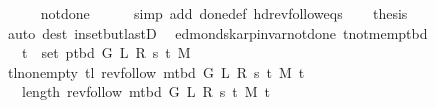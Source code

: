 \begin{isabellebody}
\ \ \ \ \isamarkupfalse%
\ not{\isacharunderscore}{\kern0pt}done{\isacharunderscore}{\kern0pt}{}\isanewline
\ \ \ \ \isamarkupfalse%
\ {\isacharparenleft}{\kern0pt}simp\ add{\isacharcolon}{\kern0pt}\ done{\isacharunderscore}{\kern0pt}{}{\isacharunderscore}{\kern0pt}def\ hd{\isacharunderscore}{\kern0pt}rev{\isacharunderscore}{\kern0pt}follow{\isacharunderscore}{\kern0pt}eq{\isacharunderscore}{\kern0pt}s{\isacharparenright}{\kern0pt}\isanewline
\ \ \isamarkupfalse%
\ {\isacharquery}{\kern0pt}thesis\isanewline
\ \ \ \ \isamarkupfalse%
\ {\isacharparenleft}{\kern0pt}auto\ dest{\isacharcolon}{\kern0pt}\ in{\isacharunderscore}{\kern0pt}set{\isacharunderscore}{\kern0pt}butlastD{\isacharparenright}{\kern0pt}\isanewline
{}\isamarkupfalse%
%
\endisatagproof
{\isafoldproof}%
%
\isadelimproof
\isanewline
%
\endisadelimproof
%
\isadeliminvisible
\isanewline
%
\endisadeliminvisible
%
\isataginvisible
{}\isamarkupfalse%
\ {\isacharparenleft}{\kern0pt}\ edmonds{\isacharunderscore}{\kern0pt}karp{\isacharunderscore}{\kern0pt}invar{\isacharunderscore}{\kern0pt}not{\isacharunderscore}{\kern0pt}done{\isacharunderscore}{\kern0pt}{}{\isacharparenright}{\kern0pt}\ t{\isacharunderscore}{\kern0pt}not{\isacharunderscore}{\kern0pt}mem{\isacharunderscore}{\kern0pt}p{\isacharunderscore}{\kern0pt}tbd{\isacharcolon}{\kern0pt}\isanewline
\ \ \ {\isachardoublequoteopen}t\ {\isasymnotin}\ set\ {\isacharparenleft}{\kern0pt}p{\isacharunderscore}{\kern0pt}tbd\ G\ L\ R\ s\ t\ M{\isacharparenright}{\kern0pt}{\isachardoublequoteclose}%
\endisataginvisible
{\isafoldinvisible}%
%
\isadeliminvisible
\isanewline
%
\endisadeliminvisible
%
\isadelimproof
%
\endisadelimproof
%
\isatagproof
{}\isamarkupfalse%
\ {\isacharminus}{\kern0pt}\isanewline
\ \ \isamarkupfalse%
\ tl{\isacharunderscore}{\kern0pt}non{\isacharunderscore}{\kern0pt}empty{\isacharcolon}{\kern0pt}\ {\isachardoublequoteopen}tl\ {\isacharparenleft}{\kern0pt}rev{\isacharunderscore}{\kern0pt}follow\ {\isacharparenleft}{\kern0pt}m{\isacharunderscore}{\kern0pt}tbd\ G\ L\ R\ s\ t\ M{\isacharparenright}{\kern0pt}\ t{\isacharparenright}{\kern0pt}\ {\isasymnoteq}\ {\isacharbrackleft}{\kern0pt}{\isacharbrackright}{\kern0pt}{\isachardoublequoteclose}\isanewline
\ \ \isamarkupfalse%
\ {\isacharminus}{\kern0pt}\isanewline
\ \ \ \ \isamarkupfalse%
\ {\isachardoublequoteopen}{}\ {\isasymle}\ length\ {\isacharparenleft}{\kern0pt}rev{\isacharunderscore}{\kern0pt}follow\ {\isacharparenleft}{\kern0pt}m{\isacharunderscore}{\kern0pt}tbd\ G\ L\ R\ s\ t\ M{\isacharparenright}{\kern0pt}\ t{\isacharparenright}{\kern0pt}{\isachardoublequoteclose}\isanewline

\end{isabellebody}
